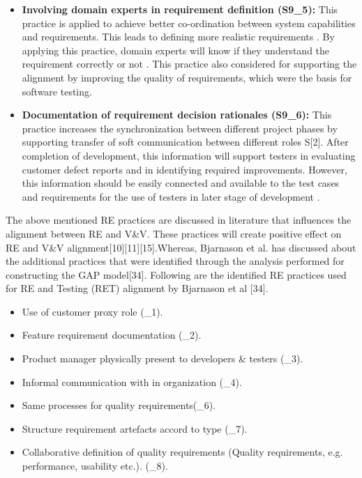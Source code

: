 \documentclass{article}
\begin{document}
\begin{itemize}
    \item \textbf{Involving domain experts in requirement definition (S9\_5):} This practice is applied to achieve better co-ordination between system capabilities and requirements. This leads to defining more realistic requirements \cite{bjarnason2014challengesS9}. By applying this practice, domain experts will know if they understand the requirement correctly or not \cite{bjarnason2014challengesS9}. This practice also considered for supporting the alignment by improving the quality of requirements, which were the basis for software testing.
    
    \item \textbf{Documentation of requirement decision rationales (S9\_6):} This practice increases the synchronization between different project phases by supporting transfer of soft communication between different roles S[2]. After completion of development, this information will support testers in evaluating customer defect reports and in identifying required improvements. However, this information should be easily connected and available to the test cases and requirements for the use of testers in later stage of development \cite{bjarnason2014challengesS9}.

\end{itemize}


The above mentioned RE practices are discussed in literature that influences the alignment between RE and V\&V. These practices will create positive effect on RE and V\&V alignment\cite{bjarnason2014challengesS9}[10][11][15].Whereas, Bjarnason et al. has discussed about the additional practices that were identified through the analysis performed for constructing the GAP model[34]. Following are the identified RE practices used for RE and Testing (RET) alignment by Bjarnason et al [34].

\begin{itemize}
\item 	Use of customer proxy role (\cite{bjarnason2014alignment}\_1).
\item 	Feature requirement documentation (\cite{bjarnason2014alignment}\_2).
\item 	Product manager physically present to developers \& testers (\cite{bjarnason2014alignment}\_3).
\item 	Informal communication with in organization (\cite{bjarnason2014alignment}\_4).
\item 	Same processes for quality requirements(\cite{bjarnason2014alignment}\_6).
\item 	Structure requirement artefacts accord to type (\cite{bjarnason2014alignment}\_7).
\item 	Collaborative definition of quality requirements (Quality requirements, e.g. performance, usability etc.). (\cite{bjarnason2014alignment}\_8).
\end{itemize}
\end{document}

